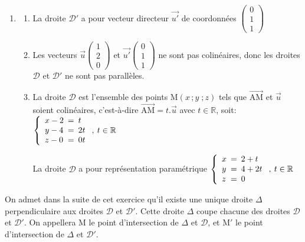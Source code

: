 \documentclass[10pt]{article}
\providecommand{\R}{\mathbb{R}}
\providecommand{\vect}[1]{\overrightarrow{#1}}
\providecommand{\vectt}[1]{\overrightarrow{\mathrm{#1}}}
\begin{document}
\begin{enumerate}
\item 

	\begin{enumerate}
		\item 
La droite $\mathcal{D}'$ a pour vecteur directeur $\vect{u'}$ de  coordonnées 
$\begin{pmatrix}
0\\1\\1
\end{pmatrix}$

		\item Les vecteurs $\vect{u}\begin{pmatrix}1\\2\\0\end{pmatrix}$ et  $\vect{u'}\begin{pmatrix}0\\1\\1\end{pmatrix}$ ne sont pas colinéaires, donc les droites $\mathcal{D}$ et $\mathcal{D}'$ ne sont pas parallèles.

		\item La droite $\mathcal{D}$ est l'ensemble des points M$\left (x\,; y\;;z\right )$ tels que $\vectt{AM}$ et $\vect{u}$ soient colinéaires, c'est-à-dire $\vectt{AM}= t.\vect{u}$ avec $t\in\R$, soit:	
$\left\{\begin{array}{l !{=} l}
x-2&t\\
y-4& 2 t\\
z-0&0t
\end{array}\right. ,\: t \in \R$
		
		
La droite $\mathcal{D}$ a pour représentation paramétrique
$\left\{\begin{array}{l !{=} l}
x&2+t\\
y&4+ 2 t\\
z&0
\end{array}\right. ,\: t \in \R$

	\end{enumerate}

\end{enumerate}

On admet dans la suite de cet exercice qu'il existe une unique droite $\Delta$ perpendiculaire aux droites $\mathcal{D}$ et $\mathcal{D}'$. Cette droite $\Delta$ coupe chacune des droites $\mathcal{D}$ et $\mathcal{D}'$. On appellera M le point d'intersection de $\Delta$ et $\mathcal{D}$, et M$'$ le point d'intersection de $\Delta$ et $\mathcal{D}'$.
\end{document}
